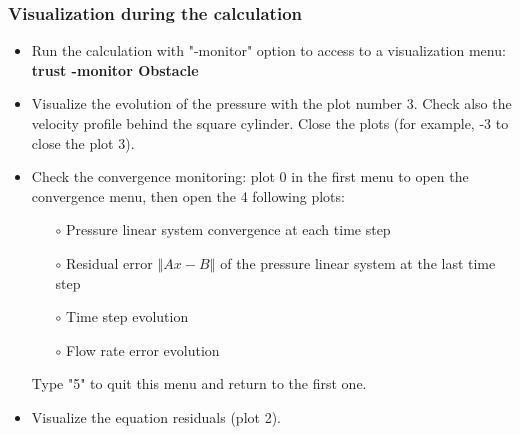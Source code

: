\documentclass[10pt]{beamer}
\begin{document}
\begin{frame}
\frametitle{Visualization during the calculation}
\begin{block}{}

\begin{itemize}

\item Run the calculation with "-monitor" option to access to a visualization menu: \\
\textbf{trust -monitor Obstacle}
\vspace{0.1cm}

\item Visualize the evolution of the pressure with the plot number 3. Check also the velocity profile behind the square cylinder. Close the plots (for example, -3 to close the plot 3).
\vspace{0.1cm}

\item Check the convergence monitoring: plot 0 in the first menu to open the convergence menu, then open the 4 following plots:
    \begin{itemize}
    \item [$\circ$] Pressure linear system convergence at each time step
    \item [$\circ$] Residual error $\left\Vert Ax-B \right\Vert$ of the pressure linear system at the last time step
    \item [$\circ$] Time step evolution
    \item [$\circ$] Flow rate error evolution
    \end{itemize}
Type "5" to quit this menu and return to the first one.
\vspace{0.1cm}

\item Visualize the equation residuals (plot 2).
\vspace{0.1cm}


\end{itemize}

\end{block}
\end{frame}
\end{document}
